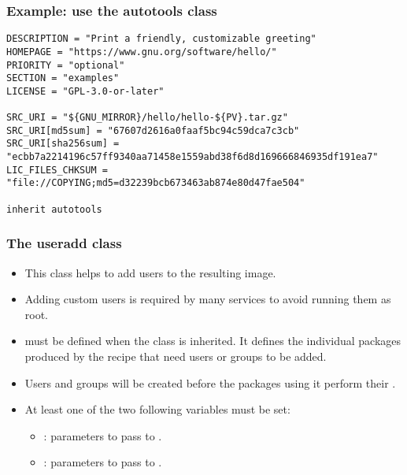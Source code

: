 \begin{frame}[fragile]
  \frametitle{Example: use the autotools class}
  \begin{block}{}
    \begin{verbatim}
DESCRIPTION = "Print a friendly, customizable greeting"
HOMEPAGE = "https://www.gnu.org/software/hello/"
PRIORITY = "optional"
SECTION = "examples"
LICENSE = "GPL-3.0-or-later"

SRC_URI = "${GNU_MIRROR}/hello/hello-${PV}.tar.gz"
SRC_URI[md5sum] = "67607d2616a0faaf5bc94c59dca7c3cb"
SRC_URI[sha256sum] = "ecbb7a2214196c57ff9340aa71458e1559abd38f6d8d169666846935df191ea7"
LIC_FILES_CHKSUM = "file://COPYING;md5=d32239bcb673463ab874e80d47fae504"

inherit autotools
    \end{verbatim}
  \end{block}
\end{frame}

\begin{frame}
  \frametitle{The useradd class}
  \begin{itemize}
    \item This class helps to add users to the resulting image.
    \item Adding custom users is required by many services to avoid
          running them as root.
    \item {} must be defined when the  class
          is inherited. It defines the individual packages produced by the
          recipe that need users or groups to be added.
    \item Users and groups will be created before the packages using
          it perform their .
    \item At least one of the two following variables must be set:
    \begin{itemize}
      \item {}: parameters to pass to
            .
      \item {}: parameters to pass to
            .
    \end{itemize}
  \end{itemize}
\end{frame}

